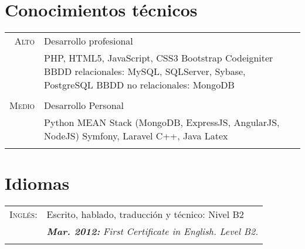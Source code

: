 \documentclass[a4paper,10pt]{article}
\begin{document}
\section{Conocimientos técnicos}
\begin{tabular}{r|p{11cm}}

 	\textsc{Alto} & Desarrollo profesional \\&
	\footnotesize{
		PHP, HTML5, JavaScript, CSS3 \newline
		Bootstrap \newline
		Codeigniter \newline
		BBDD relacionales: MySQL, SQLServer, Sybase, PostgreSQL  \newline
		BBDD no relacionales: MongoDB
	}
	\\\multicolumn{2}{c}{} \\

 	\textsc{Medio} & Desarrollo Personal \\&
	\footnotesize{
		Python \newline
		MEAN Stack (MongoDB, ExpressJS, AngularJS, NodeJS)  \newline
		Symfony, Laravel \newline
		C++, Java \newline
		Latex
	}
	\\\multicolumn{2}{c}{} \\
\end{tabular}

\section{Idiomas}
\begin{tabular}{rl}
	\textsc{Inglés:}&	Escrito, hablado, traducción y técnico: Nivel B2\\&
	\emph{\textbf{Mar. 2012:} First Certificate in English. Level B2.}\\&\\	
\end{tabular}

\end{document}
